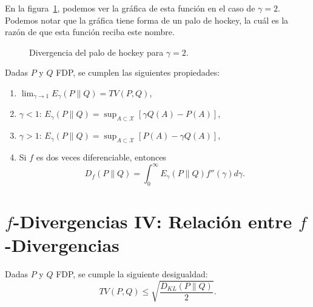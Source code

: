 En la figura~\ref{fig:hockey}, 
podemos ver la gr\'afica de esta funci\'on en el caso de $\gamma=2$. 
Podemos notar que la gráfica tiene forma de un palo de hockey, la cu\'al es la razón de que esta funci\'on reciba este nombre.
\begin{figure}[h!]
\begin{center}
\end{center}
\caption{Divergencia del palo de hockey para $\gamma=2$.}\label{fig:hockey}
\end{figure}

\begin{theorem}
    Dadas $P$ y $Q$ FDP, se cumplen las siguientes propiedades:
    \begin{enumerate}[label=(\alph*)]
        \item $\lim_{\gamma\to1}E_\gamma(P\|Q)=TV(P,Q)$,
        \item $\gamma<1$: $E_\gamma(P\|Q)=\sup_{A\subset\mathcal{X}}[\gamma Q(A)-P(A)]$,
        \item $\gamma>1$: $E_\gamma(P\|Q)=\sup_{A\subset\mathcal{X}}[P(A)-\gamma Q(A)]$,
        \item Si $f$ es dos veces diferenciable, entonces
        \begin{equation*}
            D_f(P\|Q)=\int_{0}^{\infty}E_\gamma(P\|Q)f''(\gamma)d\gamma.
        \end{equation*}
    \end{enumerate}
\end{theorem}

\section{$f$-Divergencias IV: Relaci\'on entre $f$-Divergencias}

\begin{theorem}
    Dadas $P$ y $Q$ FDP, se cumple la siguiente desigualdad:
    \begin{equation}\label{eq:Pinsker}
        TV(P,Q)\leq\sqrt{\frac{D_{KL}(P\|Q)}{2}}.
    \end{equation}
\end{theorem}

